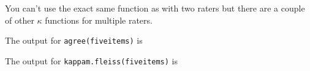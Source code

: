 \begin{Shaded}
\begin{Highlighting}[]
\NormalTok{[}\NormalTok{,]      }                  
\NormalTok{[}\NormalTok{,]      }                  
\NormalTok{[}\NormalTok{,]      }                  
\NormalTok{[}\NormalTok{,]      }                  
\NormalTok{[}\NormalTok{,]      }                  
\end{Highlighting}
\end{Shaded}

You can't use the exact same function as with two raters but there are a
couple of other \(\kappa\) functions for multiple raters.

\begin{Shaded}
\begin{Highlighting}[]
\end{Highlighting}
\end{Shaded}

The output for \texttt{agree(fiveitems)} is

\begin{Shaded}
\begin{Highlighting}[]
\NormalTok{ (}\NormalTok{)}

\OtherTok{=} 
\OtherTok{=} 
\NormalTok{  \%}\SpecialCharTok{{-}}\OtherTok{=} 
\end{Highlighting}
\end{Shaded}

The output for \texttt{kappam.fleiss(fiveitems)} is

\begin{Shaded}
\begin{Highlighting}[]


\end{Highlighting}
\end{Shaded}

